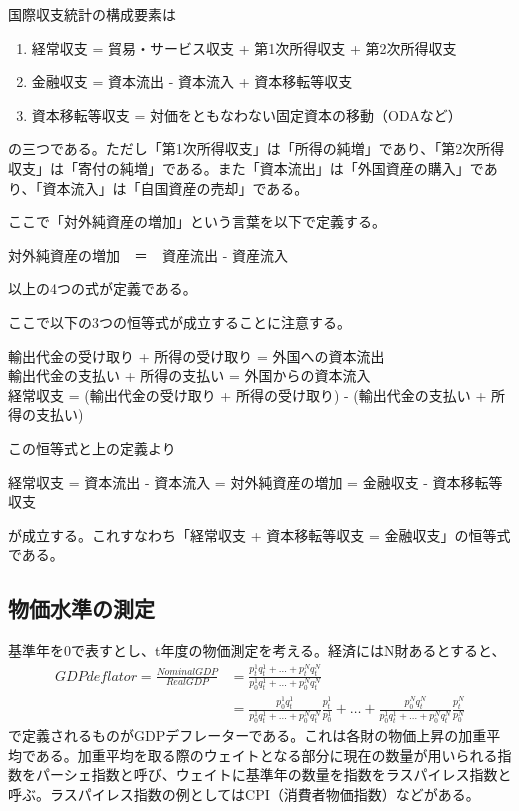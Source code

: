 \documentclass{jsarticle}
\begin{document}
国際収支統計の構成要素は
\begin{screen}
\begin{enumerate}
	\item 経常収支 = 貿易・サービス収支 + 第1次所得収支 + 第2次所得収支
	\item 金融収支 = 資本流出 - 資本流入 + 資本移転等収支
	\item 資本移転等収支 = 対価をともなわない固定資本の移動（ODAなど）
\end{enumerate}
\end{screen}
の三つである。ただし「第1次所得収支」は「所得の純増」であり、「第2次所得収支」は「寄付の純増」である。また「資本流出」は「外国資産の購入」であり、「資本流入」は「自国資産の売却」である。

ここで「対外純資産の増加」という言葉を以下で定義する。
\begin{screen}
	対外純資産の増加　＝　資産流出 - 資産流入
\end{screen}
以上の4つの式が定義である。

ここで以下の3つの恒等式が成立することに注意する。
\begin{screen}
	輸出代金の受け取り + 所得の受け取り = 外国への資本流出\\
	輸出代金の支払い + 所得の支払い = 外国からの資本流入\\
	経常収支 = (輸出代金の受け取り + 所得の受け取り) - (輸出代金の支払い + 所得の支払い)
\end{screen}
この恒等式と上の定義より
\begin{screen}
	経常収支 = 資本流出 - 資本流入  = 対外純資産の増加 = 金融収支 - 資本移転等収支
\end{screen}
が成立する。これすなわち「経常収支 + 資本移転等収支 = 金融収支」の恒等式である。

\subsection{物価水準の測定}
基準年を0で表すとし、t年度の物価測定を考える。経済にはN財あるとすると、
\begin{align*}
	GDPdeflator = \frac{Nominal GDP}{Real GDP} &= \frac{p_t^1 q_t^1 + \dots + p_t^N q_t^N}{p_0^1q_t^1 + \dots + p_0^Nq_t^N}\\
	&= \frac{p_0^1q_t^1}{p_0^1q_t^1 + \dots + p_0^Nq_t^N}\frac{p_t^1}{p_0^1} + \dots + \frac{p_0^Nq_t^N}{p_0^1q_t^1 + \dots + p_0^Nq_t^N}\frac{p_t^N}{p_0^N}
\end{align*}
で定義されるものがGDPデフレーターである。これは各財の物価上昇の加重平均である。加重平均を取る際のウェイトとなる部分に現在の数量が用いられる指数をパーシェ指数と呼び、ウェイトに基準年の数量を指数をラスパイレス指数と呼ぶ。ラスパイレス指数の例としてはCPI（消費者物価指数）などがある。
\end{document}
